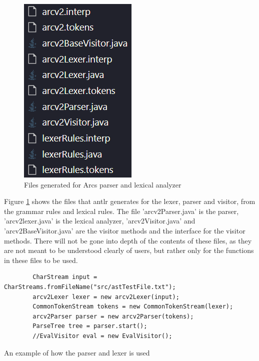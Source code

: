 \begin{figure}[htb!]
    \begin{center}
        \includegraphics{figures/lexerAndParserFiles.png}
        \caption{Files generated for Arcs parser and lexical analyzer}
        \label{fig:lexerandparserfiles}
    \end{center}
\end{figure}

Figure \ref{fig:lexerandparserfiles} shows the files that \gls{antlr} generates for the lexer, parser and visitor, from the grammar rules and lexical rules. The file 'arcv2Parser.java' is the parser, 'arcv2lexer.java' is the lexical analyzer, 'arcv2Visitor.java' and 'arcv2BaseVisitor.java' are the visitor methods and the interface for the visitor methods. There will not be gone into depth of the contents of these files, as they are not meant to be understood clearly of users, but rather only for the functions in these files to be used. 

\begin{listing}[htb!]
    \begin{verbatim}
        CharStream input = CharStreams.fromFileName("src/astTestFile.txt");
        arcv2Lexer lexer = new arcv2Lexer(input);
        CommonTokenStream tokens = new CommonTokenStream(lexer);
        arcv2Parser parser = new arcv2Parser(tokens);
        ParseTree tree = parser.start();
        //EvalVisitor eval = new EvalVisitor();
    \end{verbatim}
    \caption{An example of how the parser and lexer is used}
    \label{lst:parserandlexerexample}
\end{listing}

